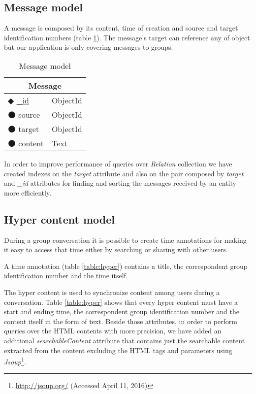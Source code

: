 \subsection{Message model}

A message is composed by its content, time of creation and source and target identification numbers (table \ref{table:message}). The message's target can reference any of object but our application is only covering messages to groups.

\begin{table}[!htb]
\centering
\caption{Message model}
\label{table:message}
    \begin{tabular}{|ll|}
        \hline
        \multicolumn{2}{|c|}{\textbf{Message}}      \\ \hline
        $\Diamondblack$ \underline{\_id}  & ObjectId  \\ 
        $\medbullet$ source           & ObjectId    \\ 
        $\medbullet$ target      & ObjectId         \\ 
        $\medbullet$ content      & Text            \\ \hline
    \end{tabular}
\end{table}

In order to improve performance of queries over \emph{Relation} collection we have created indexes on the \emph{target} attribute and also on the pair composed by \emph{target} and \emph{\_id} attributes for finding and sorting the messages received by an entity more efficiently.

\subsection{Hyper content model}

During a group conversation it is possible to create time annotations for making it easy to access that time either by searching or sharing with other users.

A time annotation (table \ref{table:hyper}) contains a title, the correspondent group identification number and the time itself.

The hyper content is used to synchronize content among users during a conversation. Table \ref{table:hyper} shows that every hyper content must have a start and ending time, the correspondent group identification number and the content itself in the form of text. Beside those attributes, in order to perform queries over the \ac{HTML} contents with more precision, we have added an additional \emph{searchableContent} attribute that contains just the searchable content extracted from the content excluding the \ac{HTML} tags and parameters using \emph{Jsoup}\footnote{\url{http://jsoup.org/} (Accessed April 11, 2016)}. 


